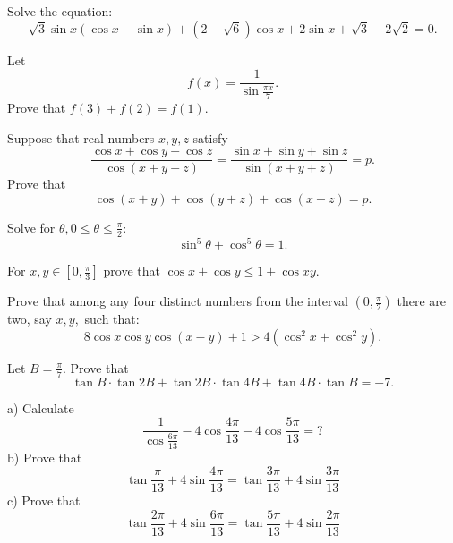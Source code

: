 \begin{question} Solve the equation:
\[ \sqrt {3} \sin x ( \cos x- \sin x ) + (2- \sqrt {6} ) \cos x+ 2 \sin x+ \sqrt {3} - 2 \sqrt {2} = 0.\]
\end{question}



\begin{question} Let $$f(x)=\displaystyle\frac{1}{\sin\frac{\pi x}{7}}.$$ Prove that $ f(3)+f(2)=f(1).$
\end{question}




\begin{question} Suppose that real numbers $ x,y,z$ satisfy
\[ \dfrac{\cos{x}+\cos{y}+\cos{z}}{\cos{(x+y+z)}}=\dfrac{\sin{x}+\sin{y}+\sin{z}}{\sin{(x+y+z)}}=p.\]
Prove that \[ \cos{(x+y)}+\cos{(y+z)}+\cos{(x+z)}=p.\]
\end{question}



\begin{question} Solve for $ \theta, 0 \le \theta \le \frac{\pi}{2}$:
\[ \sin^5 \theta + \cos^5 \theta =1.\]
\end{question}


\begin{question} For $ x,y\in [0, \frac{\pi}{3}]$ prove that $ \cos x+\cos y\leq 1+\cos xy.$
\end{question}



\begin{question} Prove that among any four distinct numbers from the interval $ (0,\frac{\pi}{2})$ there are two, say $ x,y,$ such that:
\[8 \cos x \cos y \cos (x-y)+1>4(\cos ^2 x+\cos ^2 y).\]
\end{question}



\begin{question} Let $ B= \frac{\pi}{7}.$ Prove that
\[ \tan B \cdot \tan 2B +  \tan 2B \cdot \tan 4B + \tan 4B \cdot \tan B=-7.\]
\end{question}


\begin{question} a) Calculate
\[ \frac {1}{{\cos \frac {{6\pi }}{{13}}}} - 4\cos \frac {{4\pi }}{{13}} - 4\cos \frac {{5\pi }}{{13}} = ?
\]
b) Prove that
\[ \tan\frac {\pi }{{13}} + 4\sin \frac {{4\pi }}{{13}} = \tan\frac {{3\pi }}{{13}} + 4\sin \frac {{3\pi }}{{13}}
\]
c) Prove that
\[ \tan\frac {{2\pi }}{{13}} + 4\sin \frac {{6\pi }}{{13}} = \tan\frac {{5\pi }}{{13}} + 4\sin \frac {{2\pi }}{{13}}
\]
\end{question}



